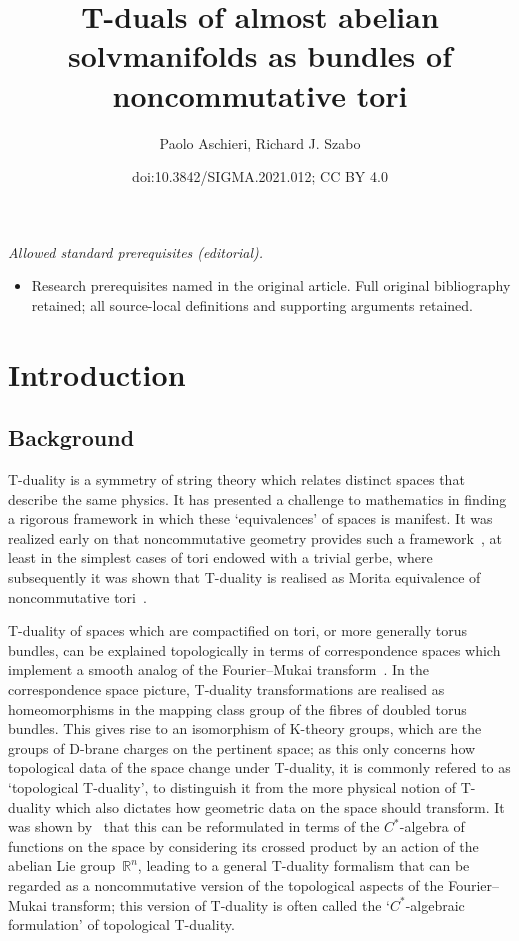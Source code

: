 \documentclass[10pt,a4paper]{amsart}
\title{T-duals of almost abelian solvmanifolds as bundles of noncommutative tori}
\author{Paolo Aschieri, Richard J. Szabo}
\date{doi:10.3842/SIGMA.2021.012; CC BY 4.0}
\numberwithin{equation}{section}
\newcommand{\R}{\real}
\newcommand{\real}{{\mathbb R}} %
\begin{document}
\maketitle
\noindent\textit{Allowed standard prerequisites (editorial).}\begin{itemize}
\item Research prerequisites named in the original article. Full original bibliography retained; all source-local definitions and supporting arguments retained.
\end{itemize}\medskip
\section{Introduction}\label{sec:intro}

\subsection{Background}

T-duality is a symmetry of string theory which relates distinct
spaces that describe the same physics. It has presented a challenge to
mathematics in finding a rigorous framework in which these
`equivalences' of spaces is manifest. It was realized early on that
noncommutative geometry provides such a
framework~\cite{Frohlich1993,Lizzi1997}, at least in the
simplest cases of tori endowed with a trivial
gerbe, where subsequently it was shown that T-duality is realised as
Morita equivalence of noncommutative
tori~\cite{Brace:1998ku,Landi1998,Pioline1999,Schwarz1998,Seiberg1999}.

T-duality of spaces which are compactified on tori, or more generally
torus bundles, can be explained topologically
in terms of correspondence spaces which implement a smooth analog of the
Fourier--Mukai transform~\cite{Hori1999}. In the correspondence space
picture, T-duality transformations are realised as homeomorphisms in the
mapping class group of the fibres of doubled torus bundles. This gives rise to an
isomorphism of K-theory groups, which are the groups of D-brane
charges on the pertinent space; as this only concerns how topological
data of the space change under T-duality, it is commonly refered to as
`topological T-duality', to distinguish it from the more physical
notion of T-duality which also dictates how geometric data on
the space should transform. It was shown by~\cite{Mathai2004} that
this can be reformulated in terms of the $C^*$-algebra of functions on
the space by considering its crossed product by an action of the
abelian Lie group~$\R^n$, leading to a general T-duality formalism
that can be regarded as a noncommutative version of the topological
aspects of the Fourier--Mukai transform; this version of T-duality is
often called the `$C^*$-algebraic formulation' of topological
T-duality.
\end{document}
